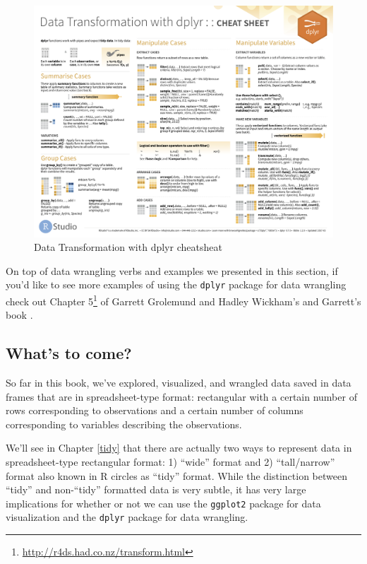 \documentclass[12pt, krantz2,]{krantz}
\renewcommand{\href}[2]{#2\footnote{\url{#1}}}
\begin{document}
\begin{figure}

{\centering \includegraphics[width=\textwidth]{images/dplyr_cheatsheet-1} 

}

\caption{Data Transformation with dplyr cheatsheat}\label{fig:dplyr-cheatsheet}
\end{figure}

On top of data wrangling verbs and examples we presented in this section, if you'd like to see more examples of using the \texttt{dplyr} package for data wrangling check out \href{http://r4ds.had.co.nz/transform.html}{Chapter 5} of Garrett Grolemund and Hadley Wickham's and Garrett's book \citep{rds2016}.

\hypertarget{whats-to-come-1}{%
\subsection{What's to come?}\label{whats-to-come-1}}

So far in this book, we've explored, visualized, and wrangled data saved in data frames that are in spreadsheet-type format: rectangular with a certain number of rows corresponding to observations and a certain number of columns corresponding to variables describing the observations.

We'll see in Chapter \ref{tidy} that there are actually two ways to represent data in spreadsheet-type rectangular format: 1) ``wide'' format and 2) ``tall/narrow'' format also known in R circles as ``tidy'' format. While the distinction between ``tidy'' and non-``tidy'' formatted data is very subtle, it has very large implications for whether or not we can use the \texttt{ggplot2} package for data visualization and the \texttt{dplyr} package for data wrangling.
\end{document}
